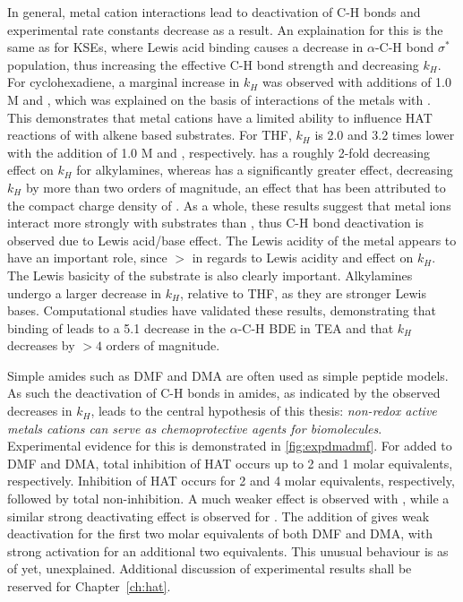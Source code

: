In general, metal cation interactions lead to deactivation of C-H bonds and experimental rate constants decrease as a result. An explaination for this is the same as for KSEs, where Lewis acid binding causes a decrease in $\alpha$-C-H bond $\sigma^*$ population, thus increasing the effective C-H bond strength and decreasing $k_H$. For cyclohexadiene, a marginal increase in $k_H$ was observed with additions of 1.0 M  and , which was explained on the basis of interactions of the metals with \cumo. This demonstrates that metal cations have a limited ability to influence HAT reactions of \cumo with alkene based substrates. For THF, $k_H$ is 2.0 and 3.2 times lower with the addition of 1.0 M  and , respectively.  has a roughly 2-fold decreasing effect on $k_H$ for alkylamines, whereas  has a significantly greater effect, decreasing $k_H$ by more than two orders of magnitude, an effect that has been attributed to the compact charge density of . As a whole, these results suggest that metal ions interact more strongly with substrates than \cumo, thus C-H bond deactivation is observed due to Lewis acid/base effect. The Lewis acidity of the metal appears to have an important role, since  $>$  in regards to Lewis acidity and effect on $k_H$. The Lewis basicity of the substrate is also clearly important. Alkylamines undergo a larger decrease in $k_H$, relative to THF, as they are stronger Lewis bases. Computational studies have validated these results, demonstrating that binding of  leads to a 5.1 \kcalmol decrease in the $\alpha$-C-H BDE in TEA and that $k_H$ decreases by $>4$ orders of magnitude.\cite{Nova2014}

Simple amides such as DMF and DMA are often used as simple peptide models.\cite{Salamone2015a} As such the deactivation of C-H bonds in amides, as indicated by the observed decreases in $k_H$, leads to the central hypothesis of this thesis: \emph{non-redox active metals cations can serve as chemoprotective agents for biomolecules}. Experimental evidence for this is demonstrated in \ref{fig:expdmadmf}. For  added to DMF and DMA, total inhibition of HAT occurs up to 2 and 1 molar equivalents, respectively. Inhibition of HAT occurs for 2 and 4 molar equivalents, respectively, followed by total non-inhibition. A much weaker effect is observed with , while a similar strong deactivating effect is observed for . The addition of  gives weak deactivation for the first two molar equivalents of both DMF and DMA, with strong activation for an additional two equivalents. This unusual behaviour is as of yet, unexplained. Additional discussion of experimental results shall be reserved for Chapter~\ref{ch:hat}.

